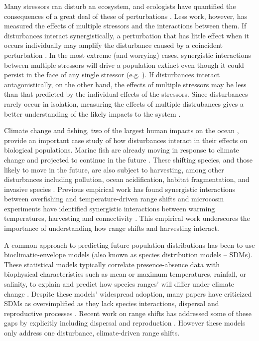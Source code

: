 \documentclass[12pt,english]{article}
\begin{document}
\begin{spacing}{1.9}
\begin{flushleft}
Many stressors can disturb an ecosystem, and ecologists have quantified the consequences of a great deal of these of perturbations \citep{Wilcoveetal1998, Crainetal2008, DarlingCote2008}. Less work, however, has measured the effects of multiple stressors and the interactions between them.  If disturbances interact synergistically, a perturbation that has little effect when it occurs individually may amplify the disturbance caused by a coincident perturbation \citep{Crainetal2008, DarlingCote2008,Nyeetal2013,Gurevitchetal2000}.   In the most extreme (and worrying) cases, synergistic interactions between multiple stressors will drive a population extinct even though it could persist in the face of any single stressor (e.g. \citet{Pelletieretal2006}).  If disturbances interact antagonistically, on the other hand, the effects of multiple stressors may be less than that predicted by the individual effects of the stressors.  Since disturbances rarely occur in isolation, measuring the effects of multiple distrubances gives a better understanding of the likely impacts to the system \citep{DoakMorris2010, Fordhametal2013, Foltetal1999}.


Climate change and fishing, two of the largest human impacts on the ocean \citep{Halpernetal2008}, provide an important case study of how disturbances interact in their effects on biological populations.  Marine fish are already moving in response to climate change \citep{Perryetal2005, HiddinkHoftstede2008, Rijnsdorpetal2009, Dulvyetal2008, Simpsonetal2011} and projected to continue in the future \citep{Kelletal2005, Mackenzieetal2007}. These shifting species, and those likely to move in the future, are also subject to harvesting, among other disturbances including pollution, ocean acidification, habitat fragmentation, and invasive species \citep{Wilcoveetal1998, Salaetal2000, MEA2005, Pinskyetal2013, Barryetal1995, Nyeetal2009}. Previous empirical work has found synergistic interactions between overfishing and temperature-driven range shifts \citep{Lingetal2009} and microcosm experiments have identified synergistic interactions between warming temperatures, harvesting and connectivity \citep{Moraetal2007}. This empirical work underscores the importance of understanding how range shifts and harvesting interact. 

A common approach to predicting future population distributions has been to use bioclimatic-envelope models (also known as species distribution models -- SDMs). These statistical models typically correlate presence-absence data with biophysical characteristics such as mean or maximum temperatures, rainfall, or salinity, to explain and predict how species ranges' will differ under climate change \citep{Elithetal2006, GuisanThuiller2005, GuisanZimmerman2000}. Despite these models' widespread adoption, many papers have criticized SDMs as oversimplified as they lack species interactions, dispersal and reproductive processes \citep{KearneyPorter2009, Zarnetskeetal2012, Robinsonetal2011}.  Recent work on range shifts has addressed some of these gaps by explicitly including dispersal and reproduction \citep{Berestyckietal2009, ZhouKot2011}. However these models only address one disturbance, climate-driven range shifts.


\end{flushleft}
\end{spacing}
\end{document}
